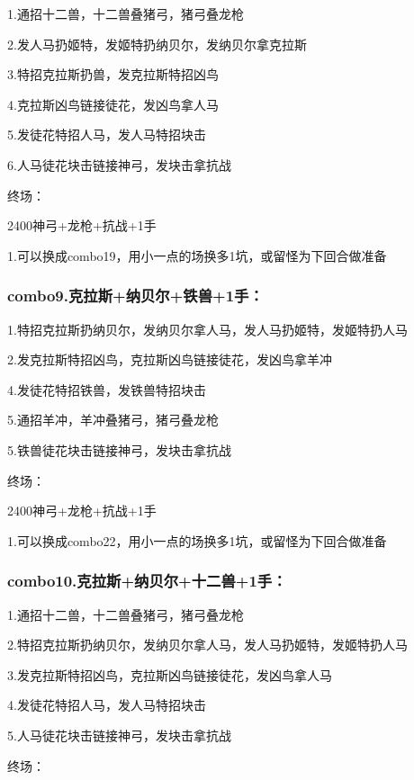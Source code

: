 \documentclass[
]{article}
\begin{document}
1.通招十二兽，十二兽叠猪弓，猪弓叠龙枪

2.发人马扔姬特，发姬特扔纳贝尔，发纳贝尔拿克拉斯

3.特招克拉斯扔兽，发克拉斯特招凶鸟

4.克拉斯凶鸟链接徒花，发凶鸟拿人马

5.发徒花特招人马，发人马特招块击

6.人马徒花块击链接神弓，发块击拿抗战

终场：

2400神弓+龙枪+抗战+1手

1.可以换成combo19，用小一点的场换多1坑，或留怪为下回合做准备

\hypertarget{combo9.ux514bux62c9ux65afux7eb3ux8d1dux5c14ux94c1ux517d1ux624b}{%
\subsubsection{combo9.克拉斯+纳贝尔+铁兽+1手：}\label{combo9.ux514bux62c9ux65afux7eb3ux8d1dux5c14ux94c1ux517d1ux624b}}

1.特招克拉斯扔纳贝尔，发纳贝尔拿人马，发人马扔姬特，发姬特扔人马

2.发克拉斯特招凶鸟，克拉斯凶鸟链接徒花，发凶鸟拿羊冲

4.发徒花特招铁兽，发铁兽特招块击

5.通招羊冲，羊冲叠猪弓，猪弓叠龙枪

5.铁兽徒花块击链接神弓，发块击拿抗战

终场：

2400神弓+龙枪+抗战+1手

1.可以换成combo22，用小一点的场换多1坑，或留怪为下回合做准备

\hypertarget{combo10.ux514bux62c9ux65afux7eb3ux8d1dux5c14ux5341ux4e8cux517d1ux624b}{%
\subsubsection{combo10.克拉斯+纳贝尔+十二兽+1手：}\label{combo10.ux514bux62c9ux65afux7eb3ux8d1dux5c14ux5341ux4e8cux517d1ux624b}}

1.通招十二兽，十二兽叠猪弓，猪弓叠龙枪

2.特招克拉斯扔纳贝尔，发纳贝尔拿人马，发人马扔姬特，发姬特扔人马

3.发克拉斯特招凶鸟，克拉斯凶鸟链接徒花，发凶鸟拿人马

4.发徒花特招人马，发人马特招块击

5.人马徒花块击链接神弓，发块击拿抗战

终场：
\end{document}
